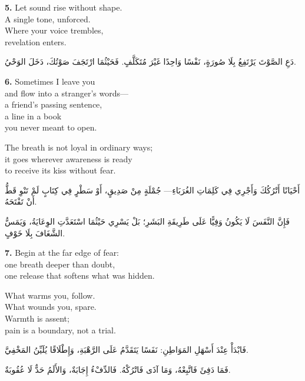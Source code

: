 \documentclass[11pt,a4paper,twoside]{book}
\begin{document}
\vspace{1em}
{\color{indigo}\bfseries 5.}\quad
Let sound rise without shape.\\
A single tone, unforced.\\
Where your voice trembles,\\
revelation enters.

\begin{flushright}
{\arabicfont
دَعِ الصَّوْتَ يَرْتَفِعُ بِلَا صُورَةٍ،
نَفْسًا وَاحِدًا غَيْرَ مُتَكَلَّفٍ.
فَحَيْثُمَا ارْتَجَفَ صَوْتُكَ،
دَخَلَ الوَحْيُ.}
\end{flushright}

\vspace{1em}
{\color{indigo}\bfseries 6.}\quad
Sometimes I leave you\\
and flow into a stranger's words—\\
a friend's passing sentence,\\
a line in a book\\
you never meant to open.

The breath is not loyal in ordinary ways;\\
it goes wherever awareness is ready\\
to receive its kiss without fear.

\begin{flushright}
{\arabicfont
أَحْيَانًا أَتْرُكُكَ
وَأَجْرِي فِي كَلِمَاتِ الغُرَبَاءِ—
جُمْلَةٍ مِنْ صَدِيقٍ،
أَوْ سَطْرٍ فِي كِتَابٍ
لَمْ تَنْوِ قَطُّ أَنْ تَفْتَحَهُ.

فَإِنَّ النَّفَسَ لَا يَكُونُ وَفِيًّا عَلَى طَرِيقَةِ البَشَرِ؛
بَلْ يَسْرِي حَيْثُمَا اسْتَعَدَّتِ الوِعَايَةُ،
وَيَمَسُّ الشَّغَافَ
بِلَا خَوْفٍ.}
\end{flushright}

\vspace{1em}
{\color{indigo}\bfseries 7.}\quad
Begin at the far edge of fear:\\
one breath deeper than doubt,\\
one release that softens what was hidden.

What warms you, follow.\\
What wounds you, spare.\\
Warmth is assent;\\
pain is a boundary, not a trial.

\begin{flushright}
{\arabicfont
فَابْدَأْ عِنْدَ أَسْهَلِ المَوَاطِنِ:
نَفَسًا يَتَقَدَّمُ عَلَى الرَّهْبَةِ،
وَإِطْلَاقًا يُلَيِّنُ المَخْفِيَّ.

فَمَا دَفِئَ فَاتَّبِعْهُ،
وَمَا آذَى فَاتْرُكْهُ.
فَالدِّفْءُ إِجَابَةٌ،
وَالأَلَمُ حَدٌّ لَا عُقُوبَةٌ.}
\end{flushright}
\end{document}
